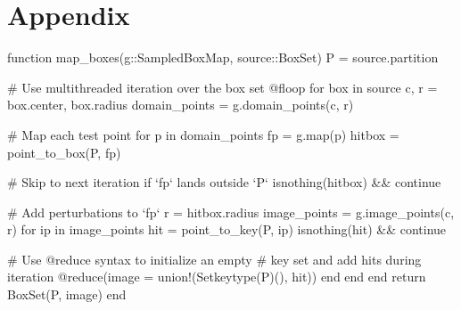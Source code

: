 
\section{Appendix}

\begin{jllisting}[float, floatplacement=hb!, language=julia, style=jlcodestyle, label=lst:boxmap, captionpos=b, caption=Function to calculate $f(\mathcal{B})$]
    function map_boxes(g::SampledBoxMap, source::BoxSet)
        P = source.partition

        # Use multithreaded iteration over the box set
        @floop for box in source
            c, r = box.center, box.radius
            domain_points = g.domain_points(c, r)
            
            # Map each test point
            for p in domain_points
                fp = g.map(p)
                hitbox = point_to_box(P, fp)

                # Skip to next iteration if `fp` lands outside `P`
                isnothing(hitbox) && continue

                # Add perturbations to `fp`
                r = hitbox.radius
                image_points = g.image_points(c, r)
                for ip in image_points
                    hit = point_to_key(P, ip)
                    isnothing(hit) && continue
                    
                    # Use @reduce syntax to initialize an empty
                    # key set and add hits during iteration
                    @reduce(image = union!(Set{keytype(P)}(), hit))
                end
            end
        end
        return BoxSet(P, image)
    end 
\end{jllisting}

